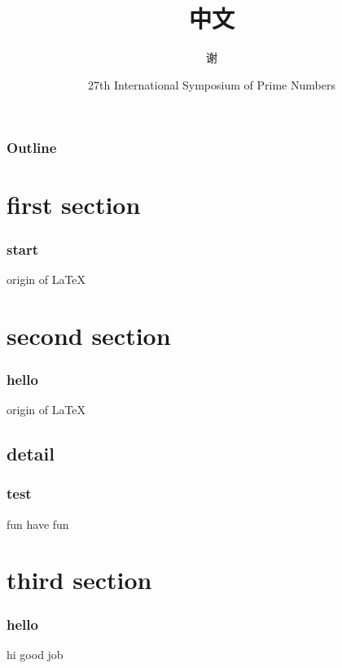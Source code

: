 \documentclass{beamer}
\begin{document}
\title{中文}
\author{谢}
\date[ISPN ’80]{27th International Symposium of Prime Numbers}

\begin{frame}
  \titlepage
\end{frame}

\begin{frame}
  \frametitle{Outline}
  \tableofcontents %
\end{frame}

\section{first section}
\begin{frame}
  \frametitle{start}{origin of \LaTeX}
\end{frame}

\section{second section}
\begin{frame}
  \frametitle{hello}{origin of \LaTeX}
\end{frame}

\subsection{detail}
\begin{frame}
  \frametitle{test}{fun}
have fun
\end{frame}

\section{third section}
\begin{frame}
  \frametitle{hello}{hi}
good job
\end{frame}
\end{document}
